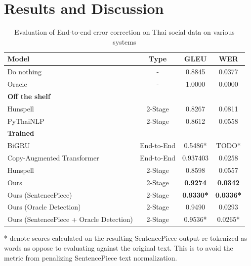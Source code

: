 
\section{Results and Discussion}

\begin{table}
  \caption{Evaluation of End-to-end error correction on Thai social data on various systems}
  \begin{threeparttable}
  \begin{tabular}{lccc}
    \toprule
    Model & Type & GLEU & WER \\
    \midrule
    Do nothing & - & 0.8845 & 0.0377 \\
    Oracle & - & 1.0000 & 0.0000 \\
    \midrule
    \textbf{Off the shelf} & \\
    Hunspell & 2-Stage & 0.8267 & 0.0811 \\
    PyThaiNLP & 2-Stage & 0.8612 & 0.0558 \\
    \midrule
    \textbf{Trained} & \\
    BiGRU & End-to-End & 0.5486* & TODO* \\
    Copy-Augmented Transformer & End-to-End & 0.937403 & 0.0258 \\
    Hunspell & 2-Stage & 0.8598 & 0.0557 \\
    \midrule
    Ours & 2-Stage & \textbf{0.9274} & \textbf{0.0342} \\
    Ours (SentencePiece) & 2-Stage & \textbf{0.9330*} & \textbf{0.0336*} \\
    Ours (Oracle Detection) & 2-Stage & 0.9490 & 0.0293 \\
    Ours (SentencePiece + Oracle Detection) & 2-Stage & 0.9536* & 0.0265* \\
    \bottomrule
  \end{tabular}
  \begin{tablenotes}\footnotesize
    \item[*] denote scores calculated on the resulting SentencePiece output re-tokenized as words as oppose to evaluating against the original text. This is to avoid the metric from penalizing SentencePiece text normalization.
  \end{tablenotes}
  \end{threeparttable}
  \label{tab:e2e_ugwc}
\end{table}

